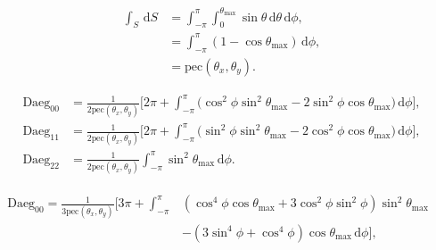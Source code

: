\documentclass[a4paper,11pt,twoside,openright]{book}
\providecommand{\pec}{{\mathrm{pec}}}%
\def\lthtmlcheckvsize{\ifdim\ht\sizebox<\vsize 
  \ifdim\wd\sizebox<\hsize\expandafter\hfill\fi \expandafter\vfill
  \else\expandafter\vss\fi}%
\begin{document}
{\newpage\clearpage
\setcounter{equation}{56}
%
\begin{subequations}\begin{align}
\int_S \,\mathrm{d}S &= \int_{-\pi}^{\pi} \int_{0}^{\theta_{\textrm{max}}} \sin\theta \,\mathrm{d}\theta \,\mathrm{d}\phi , \\
&= \int_{-\pi}^{\pi} \left( 1 - \cos\theta_{\textrm{max}}\right) \,\mathrm{d}\phi , \\
&= \pec (\theta_x , \theta_y ) .
\end{align}\end{subequations}%
\lthtmldisplayZ
\lthtmlcheckvsize\clearpage}

{\newpage\clearpage
\setcounter{equation}{57}
%
\begin{subequations}\begin{align}
\textrm{Daeg}_{00} &= \frac{1}{2\pec (\theta_x , \theta_y )} \Bigg[
2\pi +
\int_{-\pi}^{\pi}
\Big( \cos^2\phi \sin^2\theta_{\textrm{max}}- 2\sin^2\phi \cos\theta_{\textrm{max}}\Big)
\,\mathrm{d}\phi
\Bigg] , \\
\textrm{Daeg}_{11} &= \frac{1}{2\pec (\theta_x , \theta_y )} \Bigg[
2\pi +
\int_{-\pi}^{\pi}
\Big( \sin^2\phi \sin^2\theta_{\textrm{max}}- 2\cos^2\phi \cos\theta_{\textrm{max}}\Big)
\,\mathrm{d}\phi
\Bigg] , \\
\textrm{Daeg}_{22} &= \frac{1}{2\pec (\theta_x , \theta_y )}
\int_{-\pi}^{\pi}
\sin^2\theta_{\textrm{max}}
\,\mathrm{d}\phi .
\end{align}\end{subequations}%
\lthtmldisplayZ
\lthtmlcheckvsize\clearpage}

{\newpage\clearpage
\setcounter{equation}{58}
%
\begin{subequations}\begin{flalign}
\begin{split}
\textrm{Daeg}_{00} = \frac{1}{3\pec (\theta_x , \theta_y )} \Bigg[
3\pi +
\int_{-\pi}^{\pi}
& \left( \cos^4\phi \cos\theta_{\textrm{max}}+ 3\cos^2\phi \sin^2\phi \right) \sin^2\theta_{\textrm{max}}\\
& - \left( 3\sin^4\phi + \cos^4\phi \right) \cos\theta_{\textrm{max}}
\,\mathrm{d}\phi
\Bigg] ,
\end{split} &
\end{flalign}\end{subequations}%
\lthtmldisplayZ
\lthtmlcheckvsize\clearpage}
\end{document}

